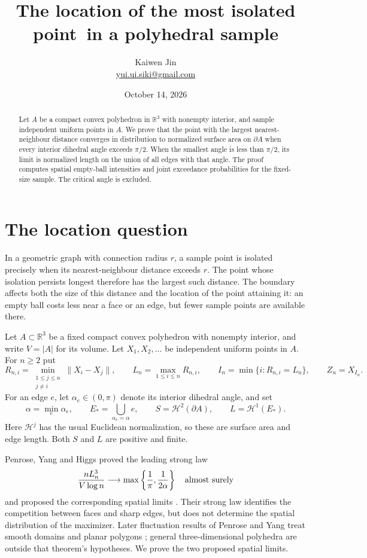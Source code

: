 \documentclass[11pt]{article}
\title{The location of the most isolated point\ in a polyhedral sample}
\author{Kaiwen Jin\\\small\href{mailto:yui.ui.siki@gmail.com}{yui.ui.siki@gmail.com}}
\date{October 14, 2026}
\newcommand{\HH}{\mathcal H}
\newcommand{\norm}[1]{\lVert #1\rVert}
\begin{document}
\maketitle
\begin{abstract}
Let $A$ be a compact convex polyhedron in $\mathbb R^3$ with nonempty
interior, and sample independent uniform points in $A$. We prove that the
point with the largest nearest-neighbour distance converges in distribution
to normalized surface area on $\partial A$ when every interior dihedral
angle exceeds $\pi/2$. When the smallest angle is less than $\pi/2$, its
limit is normalized length on the union of all edges with that angle.
The proof computes spatial empty-ball intensities and joint exceedance
probabilities for the fixed-size sample. The critical angle is excluded.
\end{abstract}

\section{The location question}

In a geometric graph with connection radius $r$, a sample point is isolated
precisely when its nearest-neighbour distance exceeds $r$. The point whose
isolation persists longest therefore has the largest such distance. The
boundary affects both the size of this distance and the location of the
point attaining it: an empty ball costs less near a face or an edge, but
fewer sample points are available there.

Let $A\subset\mathbb R^3$ be a fixed compact convex polyhedron with nonempty
interior, and write $V=|A|$ for its volume. Let $X_1,X_2,\ldots$ be
independent uniform points in $A$. For $n\geq2$ put
\[
 R_{n,i}=\min_{\substack{1\leq j\leq n\\j\ne i}}\norm{X_i-X_j},
 \qquad L_n=\max_{1\leq i\leq n}R_{n,i},
 \qquad I_n=\min\{i:R_{n,i}=L_n\},\qquad Z_n=X_{I_n}.
\]
For an edge $e$, let $\alpha_e\in(0,\pi)$ denote its interior dihedral
angle, and set
\[
 \alpha=\min_e\alpha_e,\qquad
 E_* =\bigcup_{\alpha_e=\alpha}e,\qquad
 S=\HH^2(\partial A),\qquad L=\HH^1(E_*).
\]
Here $\HH^j$ has the usual Euclidean normalization, so these are surface
area and edge length. Both $S$ and $L$ are positive and finite.

Penrose, Yang and Higgs proved the leading strong law
\[
 \frac{nL_n^3}{V\log n}\longrightarrow
 \max\left\{\frac1\pi,\frac1{2\alpha}\right\}
 \quad\hbox{almost surely}
\]
and proposed the corresponding spatial limits
\cite[Introduction, p.~1724; Corollary~2.3]{PYH}.
Their strong law identifies the competition between faces and sharp edges,
but does not determine the spatial distribution of the maximizer. Later
fluctuation results of Penrose and Yang treat smooth domains and planar
polygons \cite[arXiv v3, Theorem~1.1]{PY}; general three-dimensional polyhedra are
outside that theorem's hypotheses. We prove the two proposed spatial limits.
\end{document}
